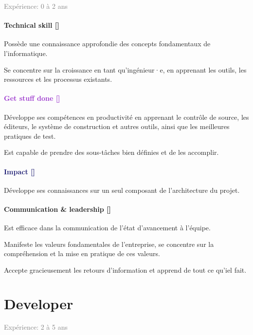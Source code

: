 \documentclass[a4paper, french, openany, 12pt]{book}
\newcommand\dex{\textcolor{BrickRed}{\textbf{Technical skill [\bsc{DEX}]}}}
\newcommand\str{\textcolor{DarkOrchid}{\textbf{Get stuff done [\bsc{STR}]}}}
\newcommand\wis{\textcolor{MidnightBlue}{\textbf{Impact [\bsc{WIS}]}}}
\newcommand\cha{\textcolor{RawSienna}{\textbf{Communication \& leadership [\bsc{CHA}]}}}
\newcommand\xp[1]{\textcolor{Gray}{Expérience: {#1} ans}}
\begin{document}
\xp{0 à 2}

\begin{multicols}{2}

  \subsubsection*{\dex} 

  Possède une connaissance approfondie des concepts fondamentaux de l'informatique.

  Se concentre sur la croissance en tant qu'ingénieur·e, en apprenant les outils, les ressources et les processus 
  existants.

  \subsubsection*{\str}

  Développe ses compétences en productivité en apprenant le contrôle de source, les éditeurs, le système de construction 
  et autres outils, ainsi que les meilleures pratiques de test.

  Est capable de prendre des sous-tâches bien définies et de les accomplir.

  \subsubsection*{\wis}

  Développe ses connaissances sur un seul composant de l'architecture du projet.

  \subsubsection*{\cha}

  Est efficace dans la communication de l'état d'avancement à l'équipe.

  Manifeste les valeurs fondamentales de l'entreprise, se concentre sur la compréhension et la mise en pratique de ces 
  valeurs.

  Accepte gracieusement les retours d'information et apprend de tout ce qu'iel fait.
\end{multicols}

\chapter{Developer}

\xp{2 à 5}
\end{document}
